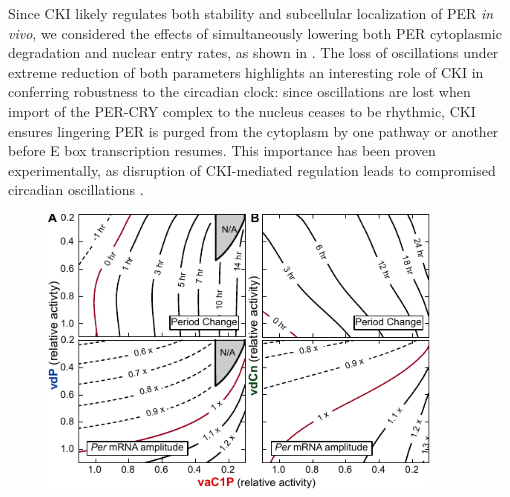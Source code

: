 Since CKI likely regulates both stability and subcellular localization of PER {\it in vivo}, we considered the effects of simultaneously lowering both PER cytoplasmic degradation and nuclear entry rates, as shown in .
The loss of oscillations under extreme reduction of both parameters highlights an interesting role of CKI in conferring robustness to the circadian clock: since oscillations are lost when import of the PER-CRY complex to the nucleus ceases to be rhythmic, CKI ensures lingering PER is purged from the cytoplasm by one pathway or another before E box transcription resumes. 
This importance has been proven experimentally, as disruption of CKI-mediated regulation leads to compromised circadian oscillations \cite{Lee2009a}.


\begin{figure}[h]
  \centering
  \includegraphics[width=0.9\textwidth]{chap4/figures/fig5.pdf}
  \label{fig:45}
\end{figure}

